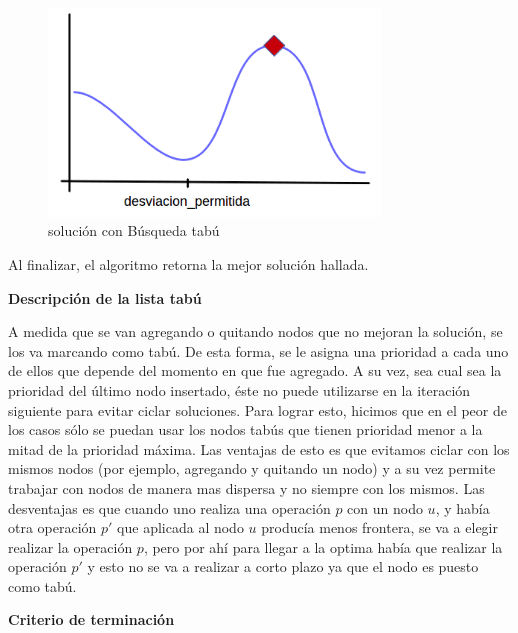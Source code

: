 \begin{figure}[H] %
\begin{center}
\includegraphics[width=250pt]{../imgs/2_tabu.png}
\caption{solución con Búsqueda tabú}
\end{center}
\end{figure}

Al finalizar, el algoritmo retorna la mejor solución hallada. \newline

\textbf{Descripción de la lista tabú} \newline

 A medida que se van agregando o quitando nodos que no mejoran la solución, se los va marcando como tabú. De esta forma, se le asigna una prioridad a cada uno de ellos que depende del momento en que fue agregado. A su vez, sea cual sea la prioridad del último nodo insertado, éste no puede utilizarse en la iteración siguiente para evitar ciclar soluciones. Para lograr esto, hicimos que en el peor de los casos sólo se puedan usar los nodos tabús que tienen prioridad menor a la mitad de la prioridad máxima. Las ventajas de esto es que evitamos ciclar con los mismos nodos (por ejemplo, agregando y quitando un nodo) y a su vez permite trabajar con nodos de manera mas dispersa y no siempre con los mismos. Las desventajas es que cuando uno realiza una operación $p$ con un nodo $u$, y había otra operación $p'$ que aplicada al nodo $u$ producía menos frontera, se va a elegir realizar la operación $p$, pero por ahí para llegar a la optima había que realizar la operación $p'$ y esto no se va a realizar a corto plazo ya que el nodo es puesto como tabú.\newline

\textbf{Criterio de terminación} \newline

